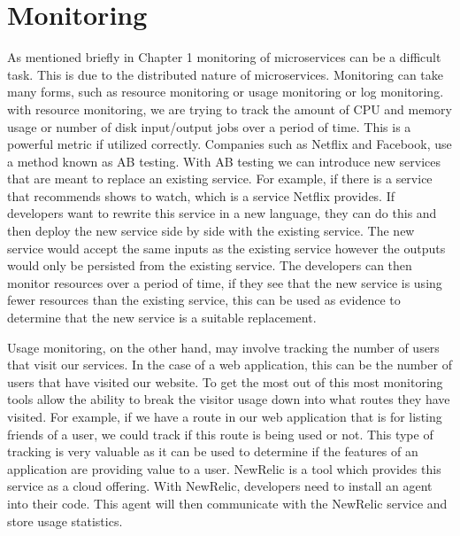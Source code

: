 \section{Monitoring}

As mentioned briefly in Chapter 1 monitoring of microservices can be a difficult task. This is due to the distributed nature of microservices. Monitoring can take many forms, such as resource monitoring or usage monitoring or log monitoring. with resource monitoring, we are trying to track the amount of CPU and memory usage or number of disk input/output jobs over a period of time. This is a powerful metric if utilized correctly. Companies such as Netflix and Facebook, use a method known as AB testing. With AB testing we can introduce new services that are meant to replace an existing service. For example, if there is a service that recommends shows to watch, which is a service Netflix provides. If developers want to rewrite this service in a new language, they can do this and then deploy the new service side by side with the existing service. The new service would accept the same inputs as the existing service however the outputs would only be persisted from the existing service. The developers can then monitor resources over a period of time, if they see that the new service is using fewer resources than the existing service, this can be used as evidence to determine that the new service is a suitable replacement.

Usage monitoring, on the other hand, may involve tracking the number of users that visit our services. In the case of a web application, this can be the number of users that have visited our website. To get the most out of this most monitoring tools allow the ability to break the visitor usage down into what routes they have visited. For example, if we have a route in our web application that is for listing friends of a user, we could track if this route is being used or not. This type of tracking is very valuable as it can be used to determine if the features of an application are providing value to a user. NewRelic is a tool which provides this service as a cloud offering. With NewRelic, developers need to install an agent into their code. This agent will then communicate with the NewRelic service and store usage statistics. 

